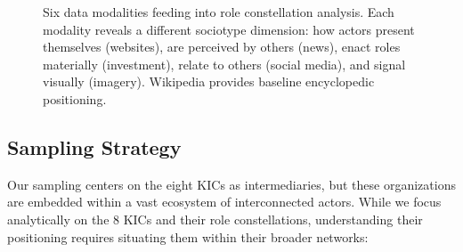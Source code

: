 \documentclass[../main.tex]{subfiles}
\begin{document}
\begin{figure}[htbp]
\begin{center}
\end{center}
\caption[Six data modalities for multimodal cartography]{Six data modalities feeding into role constellation analysis. Each modality reveals a different sociotype dimension: how actors present themselves (websites), are perceived by others (news), enact roles materially (investment), relate to others (social media), and signal visually (imagery). Wikipedia provides baseline encyclopedic positioning.}
\end{figure}

\subsection{Sampling Strategy}

Our sampling centers on the eight KICs as intermediaries, but these organizations are embedded within a vast ecosystem of interconnected actors. While we focus analytically on the 8 KICs and their role constellations, understanding their positioning requires situating them within their broader networks:
\end{document}
